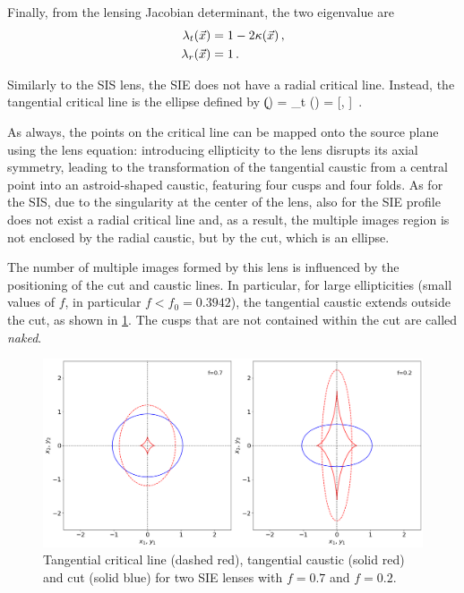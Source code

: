 Finally, from the lensing Jacobian determinant, the two eigenvalue are
\begin{subequations}
\begin{align}
    \label{eq:3.40a}
    \lambda_t (\vec{x}) & = 1 - 2 \kappa (\vec{x}) \,,
    \\
    \label{eq:3.40b}
    \lambda_r (\vec{x}) & = 1 \,.
\end{align}
\end{subequations}

Similarly to the SIS lens, the SIE does not have a radial critical line. Instead, the tangential critical line is the ellipse defined by
\be
\label{eq:3.41}
\k () =  \quad \Rightarrow \quad {}_t (\varphi) =  [\cos{(\varphi)}, \sin{(\varphi)}] \,.
\ee

As always, the points on the critical line can be mapped onto the source plane using the lens equation: introducing ellipticity to the lens disrupts its axial symmetry, leading to the transformation of the tangential caustic from a central point into an astroid-shaped caustic, featuring four cusps and four folds. As for the SIS, due to the singularity at the center of the lens, also for the SIE profile does not exist a radial critical line and, as a result, the multiple images region is not enclosed by the radial caustic, but by the cut, which is an ellipse.

The number of multiple images formed by this lens is influenced by the positioning of the cut and caustic lines. In particular, for large ellipticities (small values of $f$, in particular $f < f_0 = 0.3942$), the tangential caustic extends outside the cut, as shown in \cref{fig:naked_cusps}. The cusps that are not contained within the cut are called \emph{naked}.

\begin{figure}
    \centering
    \includegraphics[width=\linewidth, keepaspectratio]{img//chapter3/naked_cusps.png}
    \caption[SIE caustics and critical lines]{Tangential critical line (dashed red), tangential caustic (solid red) and cut (solid blue) for two SIE lenses with $f = 0.7$ and $f = 0.2$.}
    \label{fig:naked_cusps}
\end{figure}


